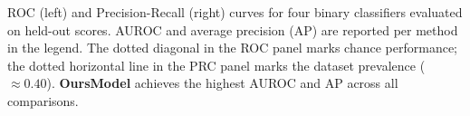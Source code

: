 \caption{ROC (left) and Precision-Recall (right) curves for four binary classifiers evaluated on held-out scores. AUROC and average precision (AP) are reported per method in the legend. The dotted diagonal in the ROC panel marks chance performance; the dotted horizontal line in the PRC panel marks the dataset prevalence ($\approx0.40$). \textbf{OursModel} achieves the highest AUROC and AP across all comparisons.}
